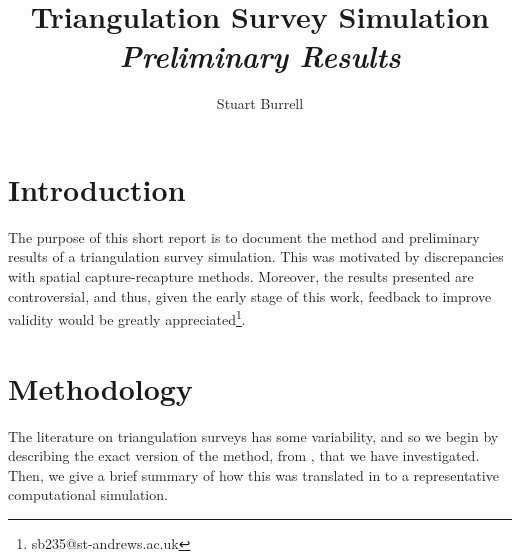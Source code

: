 \documentclass[10pt,a4paper,final]{article}
\title{Triangulation Survey Simulation\\\vspace{0.2in} \emph{Preliminary Results}}
\author{Stuart Burrell}
\begin{document}
\newcommand{\Int}{\int\limits}

\maketitle

\section{Introduction}
The purpose of this short report is to document the method and preliminary results of a triangulation survey simulation. This was motivated by discrepancies with spatial capture-recapture methods. Moreover, the results presented are controversial, and thus, given the early stage of this work, feedback to improve  validity would be greatly appreciated\footnote{sb235@st-andrews.ac.uk}.

\section{Methodology}

The literature on triangulation surveys has some variability, and so we begin
by describing the exact version of the method, from \cite{tri}, that we have investigated. Then, we give a brief summary of how this was translated in to a representative computational simulation. 
\end{document}
